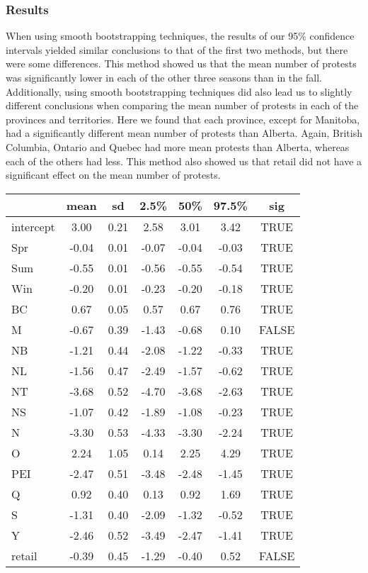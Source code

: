 \documentclass[12pt]{article}
\begin{document}
\subsubsection*{Results}
When using smooth bootstrapping techniques, the results of our 95\% confidence intervals yielded similar conclusions to that of the first two methods, but there were some differences. This method showed us that the mean number of protests was significantly lower in each of the other three seasons than in the fall.
Additionally, using smooth bootstrapping techniques did also lead us to slightly different conclusions when comparing the mean number of protests in each of the provinces and territories. Here we found that each province, except for Manitoba, had a significantly different mean number of protests than Alberta. Again, British Columbia, Ontario and Quebec had more mean protests than Alberta, whereas each of the others had less.
This method also showed us that retail did not have a significant effect on the mean number of protests.

\begin{table}[hbt!]
  \centering
  \begin{tabular}{|l|c|c|c|c|c|c|}
    \hline
              & mean  & sd   & 2.5\% & 50\%  & 97.5\% & sig   \\
    \hline
    intercept & 3.00  & 0.21 & 2.58  & 3.01  & 3.42   & TRUE  \\
    Spr       & -0.04 & 0.01 & -0.07 & -0.04 & -0.03  & TRUE  \\
    Sum       & -0.55 & 0.01 & -0.56 & -0.55 & -0.54  & TRUE  \\
    Win       & -0.20 & 0.01 & -0.23 & -0.20 & -0.18  & TRUE  \\
    BC        & 0.67  & 0.05 & 0.57  & 0.67  & 0.76   & TRUE  \\
    M         & -0.67 & 0.39 & -1.43 & -0.68 & 0.10   & FALSE \\
    NB        & -1.21 & 0.44 & -2.08 & -1.22 & -0.33  & TRUE  \\
    NL        & -1.56 & 0.47 & -2.49 & -1.57 & -0.62  & TRUE  \\
    NT        & -3.68 & 0.52 & -4.70 & -3.68 & -2.63  & TRUE  \\
    NS        & -1.07 & 0.42 & -1.89 & -1.08 & -0.23  & TRUE  \\
    N         & -3.30 & 0.53 & -4.33 & -3.30 & -2.24  & TRUE  \\
    O         & 2.24  & 1.05 & 0.14  & 2.25  & 4.29   & TRUE  \\
    PEI       & -2.47 & 0.51 & -3.48 & -2.48 & -1.45  & TRUE  \\
    Q         & 0.92  & 0.40 & 0.13  & 0.92  & 1.69   & TRUE  \\
    S         & -1.31 & 0.40 & -2.09 & -1.32 & -0.52  & TRUE  \\
    Y         & -2.46 & 0.52 & -3.49 & -2.47 & -1.41  & TRUE  \\
    retail    & -0.39 & 0.45 & -1.29 & -0.40 & 0.52   & FALSE \\
    \hline
  \end{tabular}
\end{table}
\end{document}
